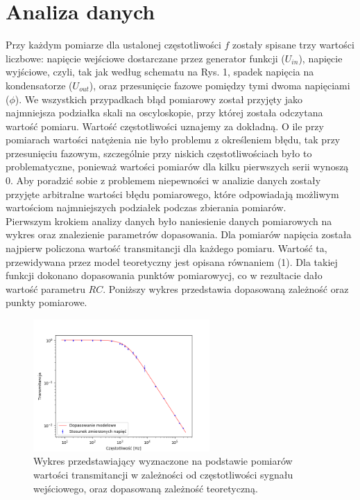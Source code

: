 \documentclass[10pt,a4paper]{article}
\begin{document}
\section*{Analiza danych}
Przy każdym pomiarze dla ustalonej częstotliwości $f$ zostały spisane trzy wartości liczbowe: napięcie wejściowe dostarczane przez generator funkcji ($U_{in}$), napięcie wyjściowe, czyli, tak jak według schematu na Rys. 1, spadek napięcia na kondensatorze ($U_{out}$), oraz przesunięcie fazowe pomiędzy tymi dwoma napięciami ($\phi$). We wszystkich przypadkach błąd pomiarowy został przyjęty jako najmniejsza podziałka skali na oscyloskopie, przy której została odczytana wartość pomiaru. Wartość częstotliwości uznajemy za dokładną. O ile przy pomiarach wartości natężenia nie było problemu z określeniem błędu, tak przy przesunięciu fazowym, szczególnie przy niskich częstotliwościach było to problematyczne, ponieważ wartości pomiarów dla kilku pierwszych serii wynoszą 0. Aby poradzić sobie z problemem niepewności w analizie danych zostały przyjęte arbitralne wartości błędu pomiarowego, które odpowiadają możliwym wartościom najmniejszych podziałek podczas zbierania pomiarów. \\
Pierwszym krokiem analizy danych było naniesienie danych pomiarowych na wykres oraz znalezienie parametrów dopasowania. Dla pomiarów napięcia została najpierw policzona wartość transmitancji dla każdego pomiaru. Wartość ta, przewidywana przez model teoretyczny jest opisana równaniem 	(1). Dla takiej funkcji dokonano dopasowania punktów pomiarowycj, co w rezultacie dało wartość parametru $RC$.
Poniższy wykres przedstawia dopasowaną zależność oraz punkty pomiarowe.

\begin{figure}[ht!]	
	\begin{center}
		\includegraphics[width = 0.6\textwidth]{alpha.png}
		\caption{Wykres przedstawiający wyznaczone na podstawie pomiarów wartości transmitancji w zależności od częstotliwości sygnału wejściowego, oraz dopasowaną zależność teoretyczną.}
	\end{center}
\end{figure}	
\end{document}

